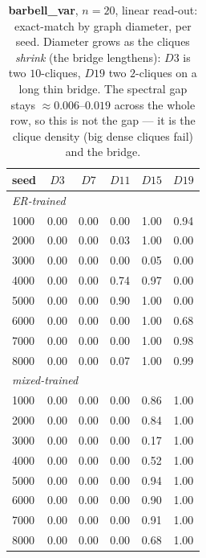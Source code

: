 \documentclass[11pt,a4paper]{article}
\begin{document}
\begin{table}[H]\centering\small
\begin{tabular}{lccccc}
\toprule
seed & $D3$ & $D7$ & $D11$ & $D15$ & $D19$ \\
\midrule
\multicolumn{6}{l}{\emph{ER-trained}}\\
1000 & 0.00 & 0.00 & 0.00 & 1.00 & 0.94 \\
2000 & 0.00 & 0.00 & 0.03 & 1.00 & 0.00 \\
3000 & 0.00 & 0.00 & 0.00 & 0.05 & 0.00 \\
4000 & 0.00 & 0.00 & 0.74 & 0.97 & 0.00 \\
5000 & 0.00 & 0.00 & 0.90 & 1.00 & 0.00 \\
6000 & 0.00 & 0.00 & 0.00 & 1.00 & 0.68 \\
7000 & 0.00 & 0.00 & 0.00 & 1.00 & 0.98 \\
8000 & 0.00 & 0.00 & 0.07 & 1.00 & 0.99 \\
\midrule
\multicolumn{6}{l}{\emph{mixed-trained}}\\
1000 & 0.00 & 0.00 & 0.00 & 0.86 & 1.00 \\
2000 & 0.00 & 0.00 & 0.00 & 0.84 & 1.00 \\
3000 & 0.00 & 0.00 & 0.00 & 0.17 & 1.00 \\
4000 & 0.00 & 0.00 & 0.00 & 0.52 & 1.00 \\
5000 & 0.00 & 0.00 & 0.00 & 0.94 & 1.00 \\
6000 & 0.00 & 0.00 & 0.00 & 0.90 & 1.00 \\
7000 & 0.00 & 0.00 & 0.00 & 0.91 & 1.00 \\
8000 & 0.00 & 0.00 & 0.00 & 0.68 & 1.00 \\
\bottomrule\end{tabular}
\caption{\textbf{barbell\_var}, $n=20$, linear read-out: exact-match by graph diameter, per seed. Diameter grows
as the cliques \emph{shrink} (the bridge lengthens): $D3$ is two $10$-cliques, $D19$ two
$2$-cliques on a long thin bridge. The spectral gap stays $\approx0.006$--$0.019$ across the whole
row, so this is not the gap --- it is the clique density (big dense cliques fail) and the bridge.}
\label{tab:bvdiam_n20}
\end{table}
\end{document}
